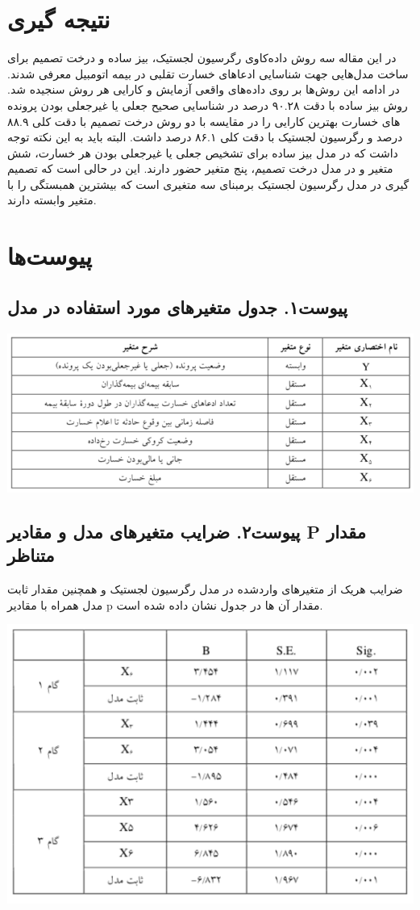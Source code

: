 \documentclass[paper=a4, fontsize=11pt]{article}
\numberwithin{equation}{section} %
\numberwithin{figure}{section} %
\numberwithin{table}{section} %
\begin{document}
\section{نتیجه گیری}
در این مقاله سه روش داده‌کاوی رگرسیون لجستیک، بیز ساده و درخت تصمیم برای ساخت مدل‌هایی جهت شناسایی ادعاهای خسارت تقلبی در بیمه اتومبیل معرفی شدند. در ادامه این روش‌ها بر روی داده‌های واقعی آزمایش و کارایی هر روش سنجیده شد. روش بیز ساده با دقت ۹۰.۲۸ درصد در شناسایی صحیح جعلی یا غیرجعلی بودن پرونده های خسارت بهترین کارایی را در مقایسه با دو روش درخت تصمیم با دقت کلی ۸۸.۹ درصد و رگرسیون لجستیک با دقت کلی ۸۶.۱ درصد داشت. البته باید به این نکته توجه داشت که در مدل بیز ساده برای تشخیص جعلی یا غیرجعلی بودن هر خسارت، شش متغیر و در مدل درخت تصمیم، پنج متغیر حضور دارند. این در حالی است که تصمیم گیری در مدل رگرسیون لجستیک برمبنای سه متغیری است که بیشترین همبستگی را با متغیر وابسته دارند.

\newpage
\section{پیوست‌ها}
\subsection{پیوست۱. جدول متغیر‌های مورد استفاده در مدل}

\includegraphics[scale=1]{p1}
\subsection{پیوست۲. ضرایب متغیرهای مدل و مقادیر P مقدار متناظر}
ضرایب هریک از متغیر‌های واردشده در مدل رگرسیون لجستیک و همچنین مقدار ثابت مدل همراه با مقادیر p مقدار آن ها در جدول نشان داده شده است.

\includegraphics[scale=1]{p2}
\end{document}
